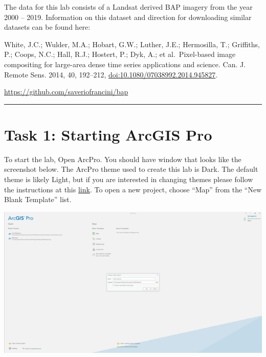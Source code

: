 \documentclass[
]{book}
\begin{document}
The data for this lab consists of a Landsat derived BAP imagery from the year 2000 -- 2019. Information on this dataset and direction for downloading similar datasets can be found here:

White, J.C.; Wulder, M.A.; Hobart, G.W.; Luther, J.E.; Hermosilla, T.; Griffiths, P.; Coops, N.C.; Hall, R.J.; Hostert, P.; Dyk, A.; et al.~Pixel-based image compositing for large-area dense time series applications and science. Can. J. Remote Sens. 2014, 40, 192--212, \url{doi:10.1080/07038992.2014.945827}.

\url{https://github.com/saveriofrancini/bap}

\begin{center}\rule{0.5\linewidth}{0.5pt}\end{center}

\hypertarget{task-1-starting-arcgis-pro}{%
\section*{Task 1: Starting ArcGIS Pro}\label{task-1-starting-arcgis-pro}}

To start the lab, Open ArcPro. You should have window that looks like the screenshot below. The ArcPro theme used to create this lab is Dark. The default theme is likely Light, but if you are interested in changing themes please follow the instructions at this \href{https://pro.arcgis.com/en/pro-app/latest/get-started/general-options.htm}{link}. To open a new project, choose ``Map'' from the ``New Blank Template'' list.

\begin{center}\includegraphics[width=1\linewidth]{images/01-starting-arcgispro-prompt} \end{center}
\end{document}

